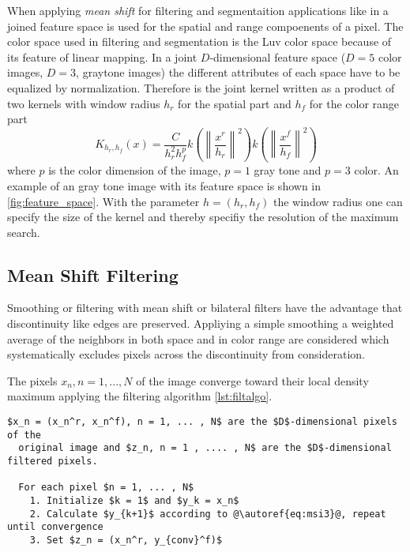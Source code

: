 When applying \emph{mean shift} for filtering and segmentaition applications
like in \citeauthor{citeulike:462300} \citep{citeulike:462300} a joined feature
space is used for the spatial and range compoenents of a pixel. The color space
used in filtering and segmentation is the \gls{Luv} color space because of its
feature of linear mapping. In a joint $D$-dimensional feature space ($D=5$ color
images, $D=3$, graytone images) the different attributes of each space have to be
equalized by normalization. Therefore is the joint kernel written as a product of
two kernels with window radius $h_r$ for the spatial part and $h_f$ for the 
color range part
\begin{equation}\label{eq:jokernel}
	K_{h_r, h_f}(x) = \frac{C}{h_r^2h_f^p}
	k \left( \left\lVert \frac{x^r}{h_r} \right\rVert^2\right) 
	k \left( \left\lVert \frac{x^f}{h_f} \right\rVert^2\right) 
\end{equation}
where $p$ is the color dimension of the image, $p=1$ gray tone and $p=3$ color. 
An example of an gray tone image with its feature space is shown in 
\autoref{fig:feature_space}. With the parameter $h = (h_r, h_f)$ the window
radius one can specify the size of the kernel and thereby specifiy the resolution
of the maximum search.

\subsection{Mean Shift Filtering} %
\label{sub:mean_shift_filtering}
Smoothing or filtering with mean shift or bilateral filters have the advantage
that discontinuity like edges are preserved. Appliying a simple smoothing a 
weighted average of the neighbors in both space and in color range are considered
which systematically excludes pixels across the discontinuity from consideration.

The pixels $x_n, n = 1, ..., N$ of the image converge toward their local density
maximum applying the filtering algorithm \autoref{lst:filtalgo}. \\

\begin{lstlisting}[caption=Mean shift filtering, label=lst:filtalgo, mathescape, numbers=none, escapechar=@, keywordstyle=\color{black}]
  $x_n = (x_n^r, x_n^f), n = 1, ... , N$ are the $D$-dimensional pixels of the
  original image and $z_n, n = 1 , .... , N$ are the $D$-dimensional filtered pixels.

  For each pixel $n = 1, ... , N$
    1. Initialize $k = 1$ and $y_k = x_n$
    2. Calculate $y_{k+1}$ according to @\autoref{eq:msi3}@, repeat until convergence
    3. Set $z_n = (x_n^r, y_{conv}^f)$ 
\end{lstlisting}

